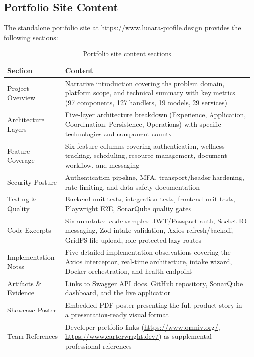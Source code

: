 \documentclass[12pt,letterpaper]{article}
\begin{document}
\subsection{Portfolio Site Content}

The standalone portfolio site at \url{https://www.lunara-profile.design} provides the following sections:

\begin{table}[H]
\centering
\small
\begin{tabularx}{\textwidth}{|>{\raggedright\arraybackslash}p{3.5cm}|>{\raggedright\arraybackslash}X|}
\hline
\rowcolor{TableHeader}\textcolor{TableHeaderText}{\textbf{Section}} & \textcolor{TableHeaderText}{\textbf{Content}} \\
\hline
Project Overview & Narrative introduction covering the problem domain, platform scope, and technical summary with key metrics (97 components, 127 handlers, 19 models, 29 services) \\
\hline
\rowcolor{TableRowAlt}
Architecture Layers & Five-layer architecture breakdown (Experience, Application, Coordination, Persistence, Operations) with specific technologies and component counts \\
\hline
Feature Coverage & Six feature columns covering authentication, wellness tracking, scheduling, resource management, document workflow, and messaging \\
\hline
\rowcolor{TableRowAlt}
Security Posture & Authentication pipeline, MFA, transport/header hardening, rate limiting, and data safety documentation \\
\hline
Testing \& Quality & Backend unit tests, integration tests, frontend unit tests, Playwright E2E, SonarQube quality gates \\
\hline
\rowcolor{TableRowAlt}
Code Excerpts & Six annotated code samples: JWT/Passport auth, Socket.IO messaging, Zod intake validation, Axios refresh/backoff, GridFS file upload, role-protected lazy routes \\
\hline
Implementation Notes & Five detailed implementation observations covering the Axios interceptor, real-time architecture, intake wizard, Docker orchestration, and health endpoint \\
\hline
\rowcolor{TableRowAlt}
Artifacts \& Evidence & Links to Swagger API docs, GitHub repository, SonarQube dashboard, and the live application \\
\hline
Showcase Poster & Embedded PDF poster presenting the full product story in a presentation-ready visual format \\
\hline
\rowcolor{TableRowAlt}
Team References & Developer portfolio links (\url{https://www.omniv.org/}, \url{https://www.carterwright.dev/}) as supplemental professional references \\
\hline
\end{tabularx}
\caption{Portfolio site content sections}
\end{table}
\end{document}
